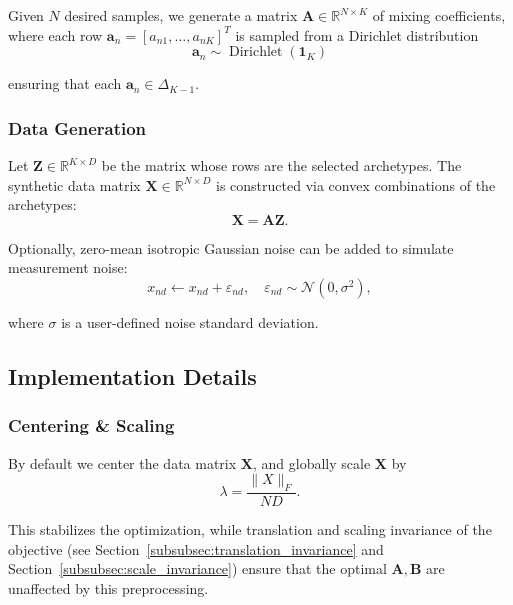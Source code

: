 \documentclass{article}
\begin{document}
Given $N$ desired samples, we generate a matrix $\mathbf{A} \in \mathbb{R}^{N \times K}$ of mixing coefficients, where each row $\mathbf{a}_n = [a_{n1}, \dots, a_{nK}]^T$ is sampled from a Dirichlet distribution
\begin{equation}
    \mathbf{a}_n \sim \operatorname{Dirichlet}(\mathbf{1}_K)
\end{equation}

ensuring that each $\mathbf{a}_n \in \Delta_{K-1}$.

\subsubsection{Data Generation}

Let $\mathbf{Z} \in \mathbb{R}^{K \times D}$ be the matrix whose rows are the selected archetypes. The synthetic data matrix $\mathbf{X} \in \mathbb{R}^{N \times D}$ is constructed via convex combinations of the archetypes:
\begin{equation}
\mathbf{X} = \mathbf{A} \mathbf{Z}.
\end{equation}

Optionally, zero-mean isotropic Gaussian noise can be added to simulate measurement noise:
\begin{equation}
    x_{nd} \leftarrow x_{nd} + \varepsilon_{nd}, \quad \varepsilon_{nd} \sim \mathcal{N}(0, \sigma^2),
\end{equation}

where $\sigma$ is a user-defined noise standard deviation.

\subsection{Implementation Details}

\subsubsection{Centering \& Scaling}

By default we center the data matrix $\mathbf{X}$, and globally scale $\mathbf{X}$ by
\begin{equation}
    \lambda = \frac{\| X \|_F}{N D}.
\end{equation}

This stabilizes the optimization, while translation and scaling invariance of the objective (see Section~\ref{subsubsec:translation_invariance} and Section~\ref{subsubsec:scale_invariance}) ensure that the optimal $\mathbf{A}, \mathbf{B}$ are unaffected by this preprocessing.
\end{document}
